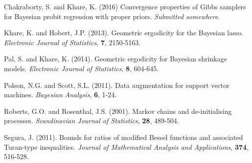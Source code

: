 \documentclass[12pt]{article}
\numberwithin{equation}{section}
\begin{document}
\begin{thebibliography}{9}
    Chakraborty, S. and Khare, K. (2016) Convergence properties of Gibbs samplers for Bayesian probit regression with proper priors.
    \emph{Submitted somewhere}.

    Khare, K. and Hobert, J.P. (2013). Geometric ergodicity for the Bayesian lasso. \emph{Electronic Journal of Statistics}, \textbf{7}, 2150-5163.

    Pal, S. and Khare, K. (2014). Geometric ergodicity for Bayesian shrinkage models. \emph{Electronic Journal of Statistics}, \textbf{8}, 604-645.

    Polson, N.G. and Scott, S.L. (2011). Data augmentation for support vector machines. \emph{Bayesian Analysis}, \textbf{6}, 1-24.

    Roberts, G.O. and Rosenthal, J.S. (2001). Markov chains and de-initialising processes. \emph{Scandinavian Journal of Statistics}, \textbf{28},
    489-504.

    Segura, J. (2011). Bounds for ratios of modified Bessel functions and associated Turan-type inequalities. \emph{Journal of Mathematical Analysis
    and Applications}, \textbf{374}, 516-528.
\end{thebibliography}
\end{document}
